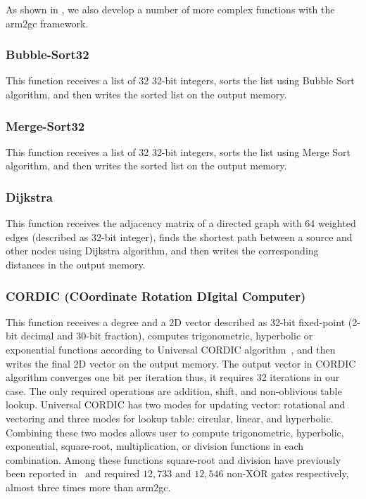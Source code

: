 As shown in , we also develop a number of more complex functions with the \gls{arm2gc} framework.

\subsubsection{Bubble-Sort32}
This function receives a list of 32 32-bit integers, sorts the list using Bubble Sort algorithm, and then writes the sorted list on the output memory.

\subsubsection{Merge-Sort32}
This function receives a list of 32 32-bit integers, sorts the list using Merge Sort algorithm, and then writes the sorted list on the output memory.

\subsubsection{Dijkstra}
This function receives the adjacency matrix of a directed graph with 64 weighted edges (described as 32-bit integer), finds the shortest path between a source and other nodes using Dijkstra algorithm, and then writes the corresponding distances in the output memory.

\subsubsection{CORDIC (COordinate Rotation DIgital Computer)}
This function receives a degree and a 2D vector described as 32-bit fixed-point (2-bit decimal and 30-bit fraction), computes trigonometric, hyperbolic or exponential functions according to Universal CORDIC algorithm~\cite{volder1959cordic}, and then writes the final 2D vector on the output memory.
The output vector in CORDIC algorithm converges one bit per iteration thus, it requires 32 iterations in our case.
The only required operations are addition, shift, and non-oblivious table lookup.
Universal CORDIC has two modes for updating vector: rotational and vectoring and three modes for lookup table: circular, linear, and hyperbolic.
Combining these two modes allows user to compute trigonometric, hyperbolic, exponential, square-root, multiplication, or division functions in each combination.
Among these functions square-root and division have previously been reported in~\cite{hussain2016privacy} and required $12,733$ and $12,546$ non-XOR gates respectively, almost three times more than \gls{arm2gc}.

